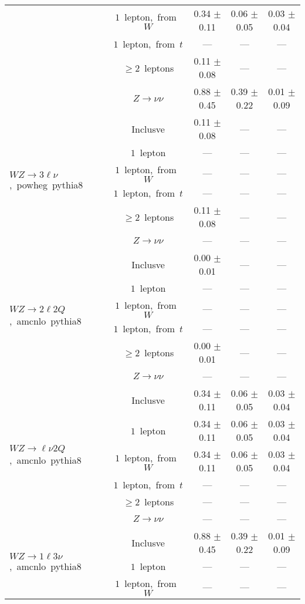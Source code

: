 \documentclass{article}
\begin{document}
\begin{longtable}{|l|c|c|c|c|}
 & $1$~lepton,~from~$W$  & 0.34 $\pm$ 0.11  & 0.06 $\pm$ 0.05  & 0.03 $\pm$ 0.04 \\* 
 & $1$~lepton,~from~$t$  & ---  & ---  & --- \\* 
 & $\ge2$~leptons  & 0.11 $\pm$ 0.08  & ---  & --- \\* 
 & $Z\rightarrow\nu\nu$  & 0.88 $\pm$ 0.45  & 0.39 $\pm$ 0.22  & 0.01 $\pm$ 0.09 \\* 
\hline 
\multirow{6}{*}{$WZ{\rightarrow}3\ell\nu$,~powheg~pythia8} & Inclusve  & 0.11 $\pm$ 0.08  & ---  & --- \\* 
 & $1$~lepton  & ---  & ---  & --- \\* 
 & $1$~lepton,~from~$W$  & ---  & ---  & --- \\* 
 & $1$~lepton,~from~$t$  & ---  & ---  & --- \\* 
 & $\ge2$~leptons  & 0.11 $\pm$ 0.08  & ---  & --- \\* 
 & $Z\rightarrow\nu\nu$  & ---  & ---  & --- \\* 
\hline 
\multirow{6}{*}{$WZ{\rightarrow}2{\ell}2Q$,~amcnlo~pythia8} & Inclusve  & 0.00 $\pm$ 0.01  & ---  & --- \\* 
 & $1$~lepton  & ---  & ---  & --- \\* 
 & $1$~lepton,~from~$W$  & ---  & ---  & --- \\* 
 & $1$~lepton,~from~$t$  & ---  & ---  & --- \\* 
 & $\ge2$~leptons  & 0.00 $\pm$ 0.01  & ---  & --- \\* 
 & $Z\rightarrow\nu\nu$  & ---  & ---  & --- \\* 
\hline 
\multirow{6}{*}{$WZ{\rightarrow}{\ell}{\nu}2Q$,~amcnlo~pythia8} & Inclusve  & 0.34 $\pm$ 0.11  & 0.06 $\pm$ 0.05  & 0.03 $\pm$ 0.04 \\* 
 & $1$~lepton  & 0.34 $\pm$ 0.11  & 0.06 $\pm$ 0.05  & 0.03 $\pm$ 0.04 \\* 
 & $1$~lepton,~from~$W$  & 0.34 $\pm$ 0.11  & 0.06 $\pm$ 0.05  & 0.03 $\pm$ 0.04 \\* 
 & $1$~lepton,~from~$t$  & ---  & ---  & --- \\* 
 & $\ge2$~leptons  & ---  & ---  & --- \\* 
 & $Z\rightarrow\nu\nu$  & ---  & ---  & --- \\* 
\hline 
\multirow{6}{*}{$WZ{\rightarrow}1{\ell}3{\nu}$,~amcnlo~pythia8} & Inclusve  & 0.88 $\pm$ 0.45  & 0.39 $\pm$ 0.22  & 0.01 $\pm$ 0.09 \\* 
 & $1$~lepton  & ---  & ---  & --- \\* 
 & $1$~lepton,~from~$W$  & ---  & ---  & --- \\* 

\end{longtable}
\end{document}
